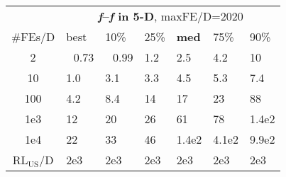 \begin{tabular}{c|llllll}
 & \multicolumn{6}{|c}{\textbf{\textit{f}\raisebox{-0.35ex}{1}--\textit{f}\raisebox{-0.35ex}{24} in 5-D}, maxFE/D=2020}\\
\#FEs/D & best & 10\% & 25\% & \textbf{med} & 75\% & 90\%\\
2 & ~\,0.73 & ~\,0.99 & \hspace*{1ex}1.2 & \hspace*{1ex}2.5 & \hspace*{1ex}4.2 & 10\\
10 & \hspace*{1ex}1.0 & \hspace*{1ex}3.1 & \hspace*{1ex}3.3 & \hspace*{1ex}4.5 & \hspace*{1ex}5.3 & \hspace*{1ex}7.4\\
100 & \hspace*{1ex}4.2 & \hspace*{1ex}8.4 & 14 & 17 & 23 & 88\\
1e3 & 12 & 20 & 26 & 61 & 78 & 1.4e2\\
1e4 & 22 & 33 & 46 & 1.4e2 & 4.1e2 & 9.9e2\\
$\text{RL}_{\text{US}}$/D & 2e3 & 2e3 & 2e3 & 2e3 & 2e3 & 2e3
\end{tabular}

